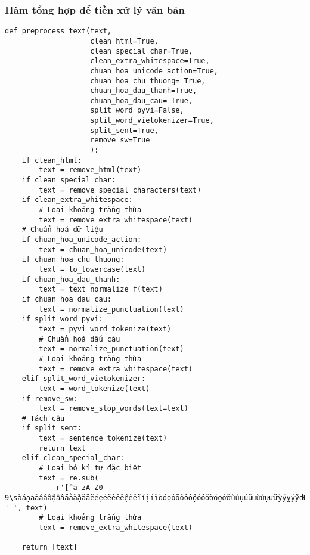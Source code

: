 \subsubsection{Hàm tổng hợp để tiền xử lý văn bản}


\begin{verbatim}
def preprocess_text(text,
                    clean_html=True,
                    clean_special_char=True,
                    clean_extra_whitespace=True,
                    chuan_hoa_unicode_action=True,
                    chuan_hoa_chu_thuong= True,
                    chuan_hoa_dau_thanh=True,
                    chuan_hoa_dau_cau= True,
                    split_word_pyvi=False,
                    split_word_vietokenizer=True,
                    split_sent=True,
                    remove_sw=True
                    ):
    if clean_html:
        text = remove_html(text)
    if clean_special_char:
        text = remove_special_characters(text)
    if clean_extra_whitespace:
        # Loại khoảng trắng thừa
        text = remove_extra_whitespace(text)
    # Chuẩn hoá dữ liệu
    if chuan_hoa_unicode_action:
        text = chuan_hoa_unicode(text)
    if chuan_hoa_chu_thuong:
        text = to_lowercase(text)
    if chuan_hoa_dau_thanh:
        text = text_normalize_f(text)
    if chuan_hoa_dau_cau:
        text = normalize_punctuation(text)
    if split_word_pyvi:
        text = pyvi_word_tokenize(text)
        # Chuẩn hoá dấu câu
        text = normalize_punctuation(text)
        # Loại khoảng trắng thừa
        text = remove_extra_whitespace(text)
    elif split_word_vietokenizer:
        text = word_tokenize(text)
    if remove_sw:
        text = remove_stop_words(text=text)
    # Tách câu
    if split_sent:
        text = sentence_tokenize(text)
        return text
    elif clean_special_char:
        # Loại bỏ kí tự đặc biệt
        text = re.sub(
            r'[^a-zA-Z0-9\sàáạảãâầấậẩẫăằắặẳẵèéẹẻẽêềếệểễìíịỉĩòóọỏõôồốộổỗơờớợởỡùúụủũưừứựửữỳýỵỷỹđĐÀÁẠẢÃÂẦẤẬẨẪĂẰẮẶẲẴÈÉẸẺẼÊỀẾỆỂỄÌÍỊỈĨÒÓỌỎÕÔỒỐỘỔỖƠỜỚỢỞỠÙÚỤỦŨƯỪỨỰỬỮỲÝỴỶỸ_]', ' ', text)
        # Loại khoảng trắng thừa
        text = remove_extra_whitespace(text)

    return [text]
\end{verbatim}



